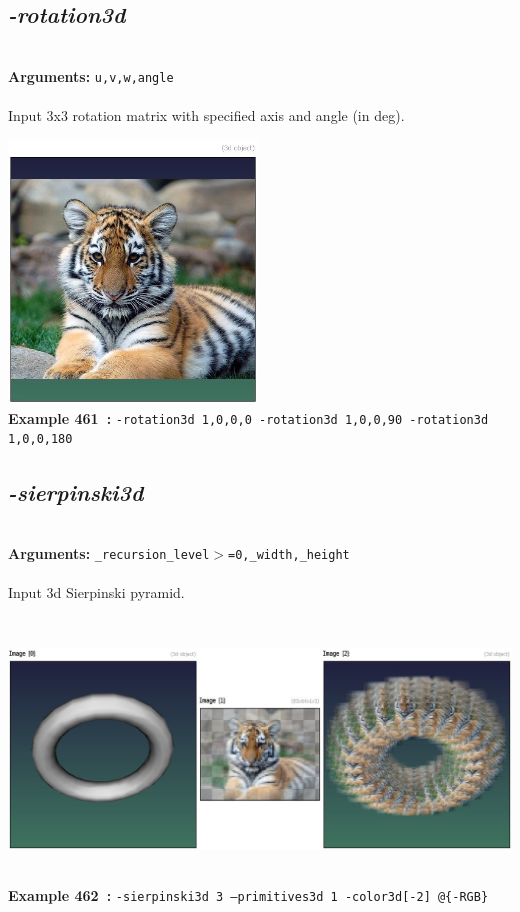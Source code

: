 \documentclass[a4paper,11pt,twoside]{book}
\begin{document}
\subsection{\emph{-rotation3d} }\vspace*{-0.5em}
~\\\textbf{Arguments: } 
{\small \texttt{u,v,w,angle}}\\~\\
Input 3x3 rotation matrix with specified axis and angle (in deg).
\begin{center}\includegraphics[keepaspectratio=true,height=7cm,width=\textwidth]{img/gmic_def461.jpg}\\
{\footnotesize \textbf{Example 461~:} \texttt{-rotation3d 1,0,0,0 -rotation3d 1,0,0,90 -rotation3d 1,0,0,180}}
\end{center}

\subsection{\emph{-sierpinski3d} }\vspace*{-0.5em}
~\\\textbf{Arguments: } 
{\small \texttt{\_recursion\_level$>$=0,\_width,\_height}}\\~\\
Input 3d Sierpinski pyramid.
\begin{center}\includegraphics[keepaspectratio=true,height=7cm,width=\textwidth]{img/gmic_def462.jpg}\\
{\footnotesize \textbf{Example 462~:} \texttt{-sierpinski3d 3 --primitives3d 1 -color3d[-2] @\{-RGB\}}}
\end{center}
\end{document}
